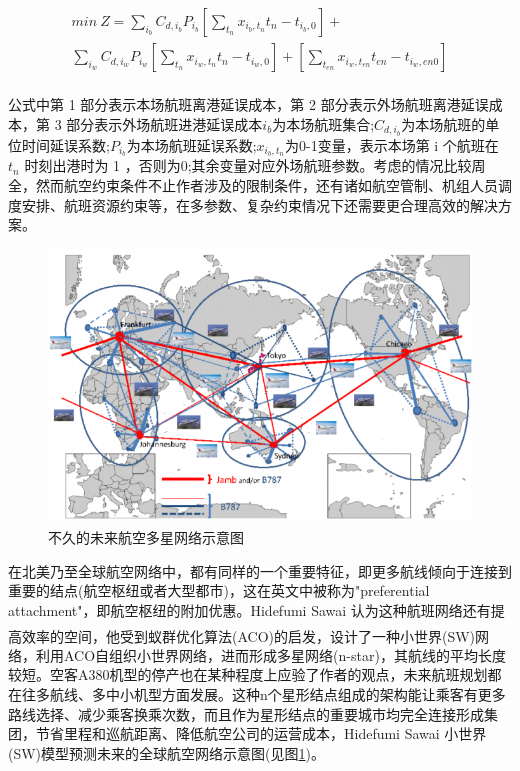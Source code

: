 \documentclass[runningheads]{llncs}
\newcommand{\upcite}[1]{\textsuperscript{\textsuperscript{\cite{#1}}}}
\begin{document}
\begin{multline*}
   min\ Z = \sum_{i_b}C_{d,i_b}P_{i_b}\left[\sum_{t_n}x_{i_b,t_n}t_n-t_{i_b,0}\right]+ \\ \sum_{i_w}C_{d,i_w}P_{i_w}\left[\sum_{t_n}x_{i_w,t_n}t_n-t_{i_w,0}\right]+\left[\sum_{t_{en}}x_{i_w,t_{en}}t_{en}-t_{i_w,en0}\right] \\
\end{multline*}  

公式中第 1 部分表示本场航班离港延误成本，第 2 部分表示外场航班离港延误成本，第 3 部分表示外场航班进港延误成本$i_b$为本场航班集合;$C_{d,i_b}$为本场航班的单位时间延误系数;$P_{i_b}$为本场航班延误系数;$x_{i_b,t_n}$为0-1变量，表示本场第 i 个航班在 $t_n$ 时刻出港时为 1 ，否则为0;其余变量对应外场航班参数。考虑的情况比较周全，然而航空约束条件不止作者涉及的限制条件，还有诸如航空管制、机组人员调度安排、航班资源约束等，在多参数、复杂约束情况下还需要更合理高效的解决方案。

\begin{figure}[ht]
\centering
\includegraphics[scale=0.8]{nstar.png}
\caption{不久的未来航空多星网络示意图}
\label{fig1}
\end{figure}

在北美乃至全球航空网络中，都有同样的一个重要特征，即更多航线倾向于连接到重要的结点(航空枢纽或者大型都市)，这在英文中被称为"preferential attachment"，即航空枢纽的附加优惠。Hidefumi Sawai 认为这种航班网络还有提高效率的空间\upcite{ref_article9}，他受到蚁群优化算法(ACO)的启发，设计了一种小世界(SW)网络，利用ACO自组织小世界网络，进而形成多星网络(n-star)，其航线的平均长度较短。空客A380机型的停产也在某种程度上应验了作者的观点，未来航班规划都在往多航线、多中小机型方面发展。这种n个星形结点组成的架构能让乘客有更多路线选择、减少乘客换乘次数，而且作为星形结点的重要城市均完全连接形成集团，节省里程和巡航距离、降低航空公司的运营成本，Hidefumi Sawai 小世界(SW)模型预测未来的全球航空网络示意图(见图\ref{fig1})。
\end{document}
